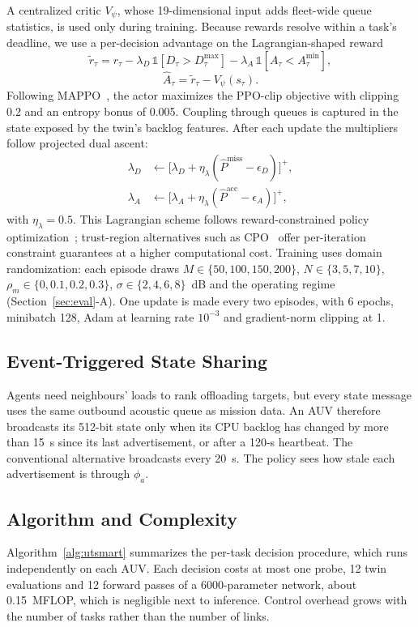 \documentclass[lettersize,journal]{IEEEtran}
\newcommand{\Dmax}{D^{\max}}
\newcommand{\Amin}{A^{\min}}
\begin{document}
A centralized critic $V_\psi$, whose 19-dimensional input adds fleet-wide queue statistics, is used only during training. Because rewards resolve within a task's deadline, we use a per-decision advantage on the Lagrangian-shaped reward
\begin{equation}
\tilde r_\tau = r_\tau - \lambda_D\, \mathbb{1}[D_\tau > \Dmax_\tau] - \lambda_A\, \mathbb{1}[A_\tau < \Amin_\tau],
\end{equation}
\begin{equation}
\hat A_\tau = \tilde r_\tau - V_\psi(s_\tau).
\end{equation}
Following MAPPO~\cite{schulman2017ppo,yu2022mappo}, the actor maximizes the PPO-clip objective with clipping 0.2 and an entropy bonus of 0.005. Coupling through queues is captured in the state exposed by the twin's backlog features. After each update the multipliers follow projected dual ascent:
\begin{align}
\lambda_D &\leftarrow \big[\lambda_D + \eta_\lambda(\hat P^{\mathrm{miss}} - \epsilon_D)\big]^+,\\
\lambda_A &\leftarrow \big[\lambda_A + \eta_\lambda(\hat P^{\mathrm{acc}} - \epsilon_A)\big]^+,
\end{align}
with $\eta_\lambda=0.5$. This Lagrangian scheme follows reward-constrained policy optimization~\cite{tessler2019rcpo}; trust-region alternatives such as CPO~\cite{achiam2017cpo} offer per-iteration constraint guarantees at a higher computational cost. Training uses domain randomization: each episode draws $M\in\{50,100,150,200\}$, $N\in\{3,5,7,10\}$, $\rho_m\in\{0,0.1,0.2,0.3\}$, $\sigma\in\{2,4,6,8\}$~dB and the operating regime (Section~\ref{sec:eval}-A). One update is made every two episodes, with 6 epochs, minibatch 128, Adam at learning rate $10^{-3}$ and gradient-norm clipping at 1.

\subsection{Event-Triggered State Sharing}
Agents need neighbours' loads to rank offloading targets, but every state message uses the same outbound acoustic queue as mission data. An AUV therefore broadcasts its 512-bit state only when its CPU backlog has changed by more than 15~s since its last advertisement, or after a 120-s heartbeat. The conventional alternative broadcasts every 20~s. The policy sees how stale each advertisement is through $\phi_a$.

\subsection{Algorithm and Complexity}
Algorithm~\ref{alg:utsmart} summarizes the per-task decision procedure, which runs independently on each AUV. Each decision costs at most one probe, 12 twin evaluations and 12 forward passes of a 6000-parameter network, about 0.15~MFLOP, which is negligible next to inference. Control overhead grows with the number of tasks rather than the number of links.
\end{document}
